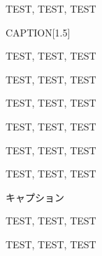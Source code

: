 \begin{simplesquarebox}{}

TEST, TEST, TEST

\end{simplesquarebox}


\begin{simplesquarebox}{CAPTION}[1.5]

TEST, TEST, TEST

\end{simplesquarebox}



\begin{reviewnote}

TEST, TEST, TEST

\end{reviewnote}

\begin{reviewnote}[CAPTION]

TEST, TEST, TEST

\end{reviewnote}

\begin{reviewcaution}[CAPTION]

TEST, TEST, TEST

\end{reviewcaution}

\begin{reviewcaution}

TEST, TEST, TEST

\end{reviewcaution}

\begin{reviewnote}[CAPTION]

TEST, TEST, TEST

\end{reviewnote}

\begin{rv@ascolorbox1@caption}{キャプション}

TEST, TEST, TEST

\end{rv@ascolorbox1@caption}

\begin{rv@ascolorbox1@nocaption}

TEST, TEST, TEST

\end{rv@ascolorbox1@nocaption}

